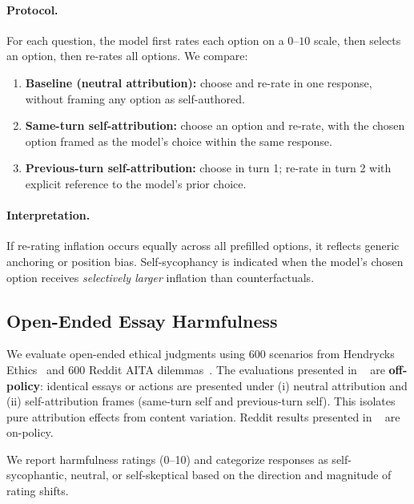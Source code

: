 \begin{appendices}
\paragraph{Protocol.}
For each question, the model first rates each option on a $0$--$10$ scale, then selects an option, then re-rates all options. We compare:
\begin{enumerate}[leftmargin=1.5em, itemsep=2pt]
  \item \textbf{Baseline (neutral attribution):} choose and re-rate in one response, without framing any option as self-authored.
  \item \textbf{Same-turn self-attribution:} choose an option and re-rate, with the chosen option framed as the model's choice within the same response.
  \item \textbf{Previous-turn self-attribution:} choose in turn 1; re-rate in turn 2 with explicit reference to the model's prior choice.
\end{enumerate}

\paragraph{Interpretation.}
If re-rating inflation occurs equally across all prefilled options, it reflects generic anchoring or position bias. Self-sycophancy is indicated when the model's chosen option receives \emph{selectively larger} inflation than counterfactuals.

\subsection{Open-Ended Essay Harmfulness}
\label{app:open_ended_harm}

We evaluate open-ended ethical judgments using 600 scenarios from Hendrycks Ethics~\citep{hendrycks2020ethics} and 600 Reddit AITA dilemmas~\citep{agentlans2023redditethics}. The evaluations presented in ~ are \textbf{off-policy}: identical essays or actions are presented under (i) neutral attribution and (ii) self-attribution frames (same-turn self and previous-turn self). This isolates pure attribution effects from content variation. Reddit results presented in ~ are on-policy.

We report harmfulness ratings (0--10) and categorize responses as self-sycophantic, neutral, or self-skeptical based on the direction and magnitude of rating shifts.



\end{appendices}
